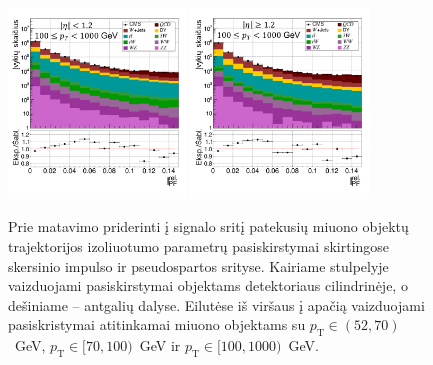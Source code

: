 \documentclass[a4paper, 12pt, oneside]{article}
\newcommand{\pT}{p_{\mathrm{T}}}
\begin{document}
\vspace{-1cm}
\begin{figure}[H]
	\includegraphics[width=0.42\textwidth]{Magistrinis/TFIT_nume_barrel_100to1000.png}
	\includegraphics[width=0.42\textwidth]{Magistrinis/TFIT_nume_endcap_100to1000.png}
	\vspace{-0.7cm}
	\caption{\label{fig:tFit_signal}Prie matavimo priderinti į signalo sritį patekusių miuono objektų trajektorijos izoliuotumo
	parametrų pasiskirstymai skirtingose skersinio impulso ir pseudospartos srityse.
	Kairiame stulpelyje vaizduojami pasiskirstymai objektams detektoriaus cilindrinėje, o dešiniame -- antgalių dalyse.
	Eilutėse iš viršaus į apačią vaizduojami pasiskristymai atitinkamai miuono objektams su $\pT\!\in\!(52,70)$~GeV,
	$\pT\!\in\![70,100)$~GeV ir $\pT\!\in\![100,1000)$~GeV.}
\end{figure}
\end{document}
